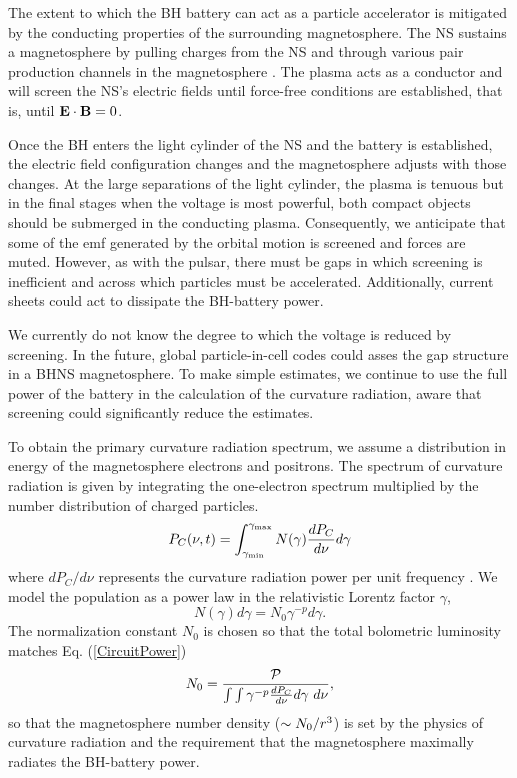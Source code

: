 The extent to which the BH battery can act as a particle accelerator
is mitigated by the conducting properties of the surrounding
magnetosphere. The NS sustains a magnetosphere by pulling charges from
the NS and through various pair production channels in the
magnetosphere \citep{GJ:1969, RudSuth:1975}.  The plasma acts as a
conductor and will screen the NS's electric fields until force-free
conditions are established, that is, until ${\bf E} \cdot {\bf B} =0$.

Once the BH enters the light cylinder of the NS and the battery is
established, the electric field configuration changes and the
magnetosphere adjusts with those changes. At the large separations of
the light cylinder, the plasma is tenuous but in the final stages when
the voltage is most powerful, both compact objects should be submerged
in the conducting plasma. Consequently, we anticipate that some of the
emf generated by the orbital motion is screened and forces are
muted. However, as with the pulsar, there must be gaps in which
screening is inefficient and across which particles must be
accelerated. Additionally, current sheets could act to dissipate the
BH-battery power.

We currently do not know the degree to which the voltage is reduced by
screening. In the future, global particle-in-cell codes could asses
the gap structure in a BHNS magnetosphere. To make simple estimates,
we continue to use the full power of the battery in the calculation of
the curvature radiation, aware that screening could significantly
reduce the estimates.
 
 
To obtain the primary curvature radiation spectrum, we assume a
distribution in energy of the magnetosphere electrons and
positrons. The spectrum of curvature radiation is given by integrating
the one-electron spectrum multiplied by the number distribution of
charged particles.
\begin{equation}
\label{PofOmega}
P_C(\nu,t) = \int^{\gamma_{\rm max}}_{\gamma_{\rm min}}{ N(\gamma)
  \frac{dP_{C}}{ d \nu} d\gamma}
\end{equation}
where $dP_C/d\nu$ represents the curvature radiation power per unit
frequency \citep[\textit{e.g},][]{CZ_SC:1996}.  We model the
population as a power law in the relativistic Lorentz factor $\gamma$,
          \begin{equation}
           \label{New:PowerLawElecs}
          N(\gamma) d\gamma = N_0 \gamma^{-p} d\gamma.
          \end{equation} 
The normalization constant $N_0$ is chosen so that the total
bolometric luminosity matches Eq. (\ref{CircuitPower})
\begin{equation}
N_0 = \frac{ \mathcal{P} }{ \int{ \int{ \gamma^{-p} \frac{dP_{C}}{ d \nu} d\gamma} \ d\nu} },
\end{equation}
so that the magnetosphere number density ($\sim N_0/r^3$) is set
by the physics of curvature radiation and the requirement that the
magnetosphere maximally radiates the BH-battery power.

